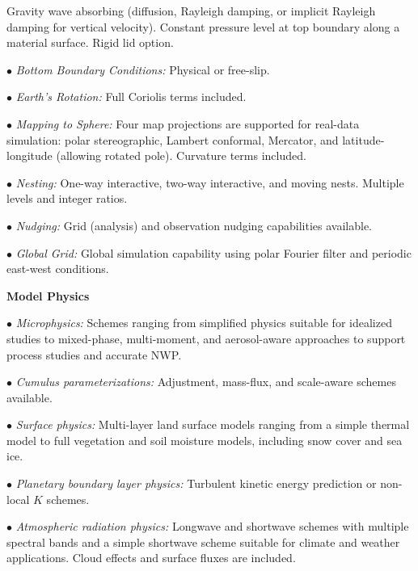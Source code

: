 \begin{description}
Gravity wave absorbing (diffusion, Rayleigh damping, or implicit 
Rayleigh damping for vertical velocity).  
Constant pressure level at top boundary along a material surface. 
Rigid lid option.
%
\item{$\bullet$} {\em Bottom Boundary Conditions:} 
Physical or free-slip.
%
\item{$\bullet$} {\em Earth's Rotation:}
Full Coriolis terms included.
%
\item{$\bullet$} {\em Mapping to Sphere:} 
Four map projections are supported for real-data simulation: 
polar stereographic, Lambert conformal, Mercator, and 
latitude-longitude (allowing rotated pole). 
Curvature terms included.
%
\item{$\bullet$} {\em Nesting:} 
One-way interactive, two-way interactive, and moving nests.
Multiple levels and integer ratios.
%
\item{$\bullet$} {\em Nudging:}
Grid (analysis) and observation nudging capabilities available. 
%
\item{$\bullet$} {\em Global Grid:}
Global simulation capability using polar Fourier filter and 
periodic east-west conditions. 
\end{description}

\newpage
\vskip 12pt
{\noindent\bf Model Physics}
\vskip 12pt

\begin{description}
\setlength{\itemsep}{-5pt}
\item{$\bullet$} {\em Microphysics:} Schemes ranging from simplified
physics suitable for idealized studies to mixed-phase, multi-moment, and aerosol-aware
approaches to support process studies and accurate NWP.
%
\item{$\bullet$} {\em Cumulus parameterizations:}
Adjustment, mass-flux, and scale-aware schemes available.
%
\item{$\bullet$} {\em Surface physics:}
Multi-layer land surface models ranging from a simple thermal model to full
vegetation and soil moisture models, including snow cover and sea ice.
%
\item{$\bullet$} {\em Planetary boundary layer physics:}
Turbulent kinetic energy prediction or non-local $K$ schemes.
%
\item{$\bullet$} {\em Atmospheric radiation physics:} 
Longwave and shortwave schemes with multiple spectral bands and a 
simple shortwave scheme suitable for climate and weather applications.  
Cloud effects and surface fluxes are included.
\end{description}

